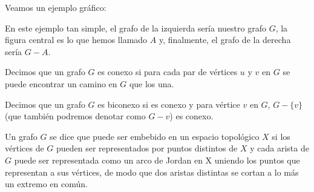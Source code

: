 \documentclass[12pt,a4paper,oldfontcommands]{memoir}
\begin{document}
	Veamos un ejemplo gráfico:
\[\]
\[\]
En este ejemplo tan simple, el grafo de la izquierda sería nuestro grafo $G$, la figura central es lo que hemos llamado $A$ y, finalmente, el grafo de la derecha sería $G-A$.

\begin{definition}
	Decimos que un grafo $G$ es conexo si para cada par de vértices $u$ y $v$ en $G$ se puede encontrar un camino en $G$ que los una.
\end{definition}

\begin{definition}
	Decimos que un grafo $G$ es biconexo si es conexo y para vértice $v$ en $G$, $G - \{v\}$ (que también podremos denotar como $G - v$) es conexo.
\end{definition}

\begin{definition}
Un grafo $G$ se dice que puede ser embebido en un espacio topológico $X$ si los vértices de $G$ pueden ser representados por puntos distintos de $X$ y cada arista de $G$ puede ser representada como un arco de Jordan en X uniendo los puntos que representan a sus vértices, de  modo que dos aristas distintas se cortan a lo más un extremo en común.
\end{definition}
\end{document}
